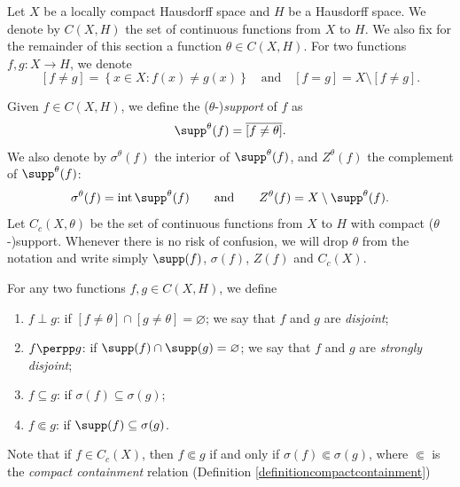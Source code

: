 Let $X$ be a locally compact Hausdorff space and $H$ be a Hausdorff space. We denote by $C(X,H)$ the set of continuous functions from $X$ to $H$. We also fix for the remainder of this section a function $\theta\in C(X,H)$. For two functions $f,g:X\to H$, we denote
\[[f\neq g]=\left\{x\in X:f(x)\neq g(x)\right\}\quad\text{and}\quad[f=g]=X\setminus[f\neq g].\]

\begin{definition}\label{definitionsigma}
Given $f\in C(X,H)$, we define the ($\theta$-)\emph{support} of $f$ as
\[\supp^\theta(f)=\overline{[f\neq\theta]}.\]
We also denote by $\sigma^\theta(f)$ the interior of $\supp^\theta(f)$, and $Z^\theta(f)$ the complement of $\supp^\theta(f)$:
\[\sigma^\theta(f)=\operatorname{int}\supp^\theta(f)\qquad\text{and}\qquad Z^\theta(f)=X\setminus\supp^\theta(f).\]
Let $C_c(X,\theta)$ be the set of continuous functions from $X$ to $H$ with compact ($\theta$-)support. Whenever there is no risk of confusion, we will drop $\theta$ from the notation and write simply $\supp(f)$, $\sigma(f)$, $Z(f)$ and $C_c(X)$.

For any two functions $f,g\in C(X,H)$, we define
\begin{enumerate}
\item $f\perp g$: if $[f\neq\theta]\cap[g\neq\theta]=\varnothing$; we say that $f$ and $g$ are \emph{disjoint};
\item $f\perpp g$: if $\supp(f)\cap\supp(g)=\varnothing$; we say that $f$ and $g$ are \emph{strongly disjoint};
\item $f\subseteq g$: if $\sigma(f)\subseteq\sigma(g)$;
\item $f\Subset g$: if $\supp(f)\subseteq\sigma(g)$.
\end{enumerate}
\end{definition}

Note that if $f\in C_c(X)$, then $f\Subset g$ if and only if $\sigma(f)\Subset\sigma(g)$, where $\Subset$ is the \emph{compact containment} relation (Definition \ref{definitioncompactcontainment})

